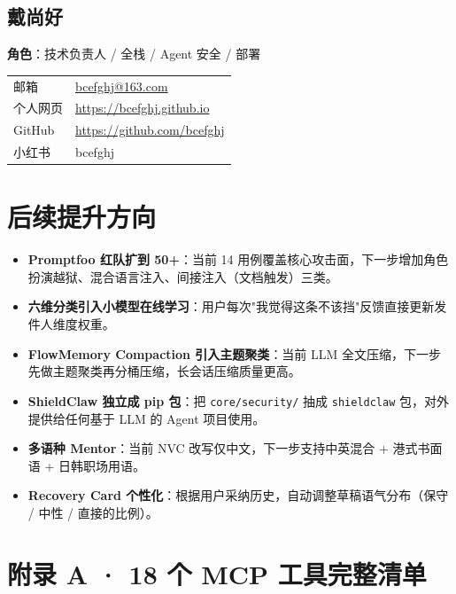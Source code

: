 \documentclass[11pt,a4paper]{ctexart}
\begin{document}
\subsection{戴尚好}
\textbf{角色}：技术负责人 / 全栈 / Agent 安全 / 部署

\begin{tabular}{p{2.5cm}p{12cm}}
\toprule
邮箱 & \href{mailto:bcefghj@163.com}{bcefghj@163.com} \\
个人网页 & \url{https://bcefghj.github.io} \\
GitHub & \url{https://github.com/bcefghj} \\
小红书 & bcefghj \\
\bottomrule
\end{tabular}

\section{后续提升方向}

\begin{itemize}
\item \textbf{Promptfoo 红队扩到 50+}：当前 14 用例覆盖核心攻击面，下一步增加角色扮演越狱、混合语言注入、间接注入（文档触发）三类。
\item \textbf{六维分类引入小模型在线学习}：用户每次"我觉得这条不该挡"反馈直接更新发件人维度权重。
\item \textbf{FlowMemory Compaction 引入主题聚类}：当前 LLM 全文压缩，下一步先做主题聚类再分桶压缩，长会话压缩质量更高。
\item \textbf{ShieldClaw 独立成 pip 包}：把 \texttt{core/security/} 抽成 \texttt{shieldclaw} 包，对外提供给任何基于 LLM 的 Agent 项目使用。
\item \textbf{多语种 Mentor}：当前 NVC 改写仅中文，下一步支持中英混合 + 港式书面语 + 日韩职场用语。
\item \textbf{Recovery Card 个性化}：根据用户采纳历史，自动调整草稿语气分布（保守 / 中性 / 直接的比例）。
\end{itemize}

\newpage
\appendix
\section*{附录 A · 18 个 MCP 工具完整清单}
\end{document}

